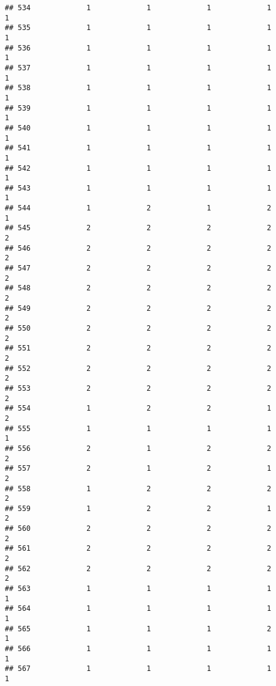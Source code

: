 \documentclass[
]{article}
\begin{document}
\begin{verbatim}
## 534             1             1             1             1             1
## 535             1             1             1             1             1
## 536             1             1             1             1             1
## 537             1             1             1             1             1
## 538             1             1             1             1             1
## 539             1             1             1             1             1
## 540             1             1             1             1             1
## 541             1             1             1             1             1
## 542             1             1             1             1             1
## 543             1             1             1             1             1
## 544             1             2             1             2             1
## 545             2             2             2             2             2
## 546             2             2             2             2             2
## 547             2             2             2             2             2
## 548             2             2             2             2             2
## 549             2             2             2             2             2
## 550             2             2             2             2             2
## 551             2             2             2             2             2
## 552             2             2             2             2             2
## 553             2             2             2             2             2
## 554             1             2             2             1             2
## 555             1             1             1             1             1
## 556             2             1             2             2             2
## 557             2             1             2             1             2
## 558             1             2             2             2             2
## 559             1             2             2             1             2
## 560             2             2             2             2             2
## 561             2             2             2             2             2
## 562             2             2             2             2             2
## 563             1             1             1             1             1
## 564             1             1             1             1             1
## 565             1             1             1             2             1
## 566             1             1             1             1             1
## 567             1             1             1             1             1

\end{verbatim}
\end{document}
